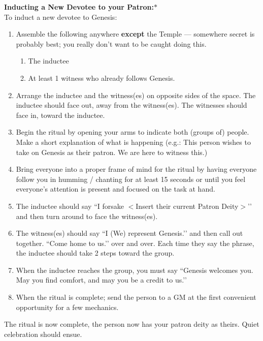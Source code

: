 \documentclass[green]{GL2020}
\begin{document}
   
\textbf{Inducting a New Devotee to your Patron:}$*$\\
To induct a new devotee to Genesis:
\begin{enumerate}
  \item Assemble the following anywhere \textbf{except} the Temple — somewhere secret is probably best; you really don’t want to be caught doing this.
  \begin{enumerate}
    \item The inductee
    \item At least 1 witness who already follows Genesis.
  \end{enumerate}
  \item Arrange the inductee and the witness(es) on opposite sides of the space. The inductee should face out, away from the witness(es). The witnesses should face in, toward the inductee.
  \item Begin the ritual by opening your arms to indicate both (groups of) people. Make a short explanation of what is happening (e.g.: This person wishes to take on Genesis as their patron. We are here to witness this.)
  \item Bring everyone into a proper frame of mind for the ritual by having everyone follow you in humming / chanting for at least 15 seconds or until you feel everyone’s attention is present and focused on the task at hand.
  \item The inductee should say ``I forsake $<$Insert their current Patron Deity$>$’’ and then turn around to face the witness(es).
  \item The witness(es) should say ``I (We) represent Genesis.’’ and then call out together. ``Come home to us.’’ over and over. Each time they say the phrase, the inductee should take 2 steps toward the group.
  \item When the inductee reaches the group, you must say ``Genesis welcomes you. May you find comfort, and may you be a credit to us.’’
  \item When the ritual is complete; send the person to a GM at the first convenient opportunity for a few mechanics.
\end{enumerate}

The ritual is now complete, the person now has your patron deity as theirs. Quiet celebration should ensue.
\end{document}
